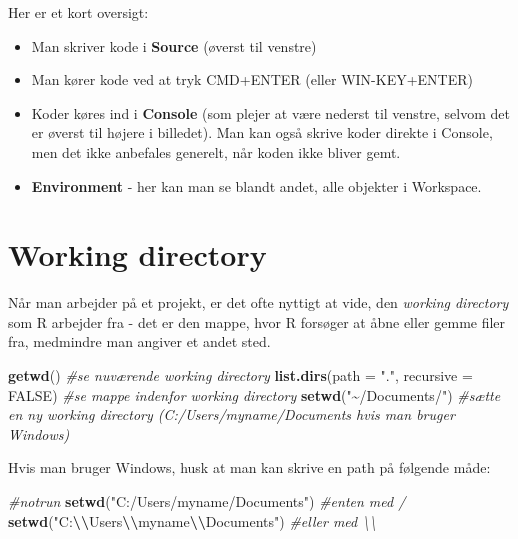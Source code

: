 \documentclass[
]{book}
\newenvironment{Shaded}{\begin{snugshade}}{\end{snugshade}}
\newcommand{\AttributeTok}[1]{\textcolor[rgb]{0.13,0.29,0.53}{#1}}
\newcommand{\CommentTok}[1]{\textcolor[rgb]{0.56,0.35,0.01}{\textit{#1}}}
\newcommand{\ConstantTok}[1]{\textcolor[rgb]{0.56,0.35,0.01}{#1}}
\newcommand{\FunctionTok}[1]{\textcolor[rgb]{0.13,0.29,0.53}{\textbf{#1}}}
\newcommand{\NormalTok}[1]{#1}
\newcommand{\SpecialCharTok}[1]{\textcolor[rgb]{0.81,0.36,0.00}{\textbf{#1}}}
\newcommand{\StringTok}[1]{\textcolor[rgb]{0.31,0.60,0.02}{#1}}
\providecommand{\tightlist}{%
  \setlength{\itemsep}{0pt}\setlength{\parskip}{0pt}}
\theoremstyle{definition}
\theoremstyle{definition}
\theoremstyle{definition}
\theoremstyle{definition}
\theoremstyle{remark}
\begin{document}
Her er et kort oversigt:

\begin{itemize}
\tightlist
\item
  Man skriver kode i \textbf{Source} (øverst til venstre)
\item
  Man kører kode ved at tryk CMD+ENTER (eller WIN-KEY+ENTER)
\item
  Koder køres ind i \textbf{Console} (som plejer at være nederst til venstre, selvom det er øverst til højere i billedet). Man kan også skrive koder direkte i Console, men det ikke anbefales generelt, når koden ikke bliver gemt.
\item
  \textbf{Environment} - her kan man se blandt andet, alle objekter i Workspace.
\end{itemize}

\section{Working directory}\label{working-directory}

Når man arbejder på et projekt, er det ofte nyttigt at vide, den \emph{working directory} som R arbejder fra - det er den mappe, hvor R forsøger at åbne eller gemme filer fra, medmindre man angiver et andet sted.

\begin{Shaded}
\begin{Highlighting}[]
\FunctionTok{getwd}\NormalTok{() }\CommentTok{\#se nuværende working directory}
\FunctionTok{list.dirs}\NormalTok{(}\AttributeTok{path =} \StringTok{"."}\NormalTok{, }\AttributeTok{recursive =} \ConstantTok{FALSE}\NormalTok{) }\CommentTok{\#se mappe indenfor working directory}
\FunctionTok{setwd}\NormalTok{(}\StringTok{"\textasciitilde{}/Documents/"}\NormalTok{) }\CommentTok{\#sætte en ny working directory (C:/Users/myname/Documents hvis man bruger Windows)}
\end{Highlighting}
\end{Shaded}

Hvis man bruger Windows, husk at man kan skrive en path på følgende måde:

\begin{Shaded}
\begin{Highlighting}[]
\CommentTok{\#notrun}
\FunctionTok{setwd}\NormalTok{(}\StringTok{"C:/Users/myname/Documents"}\NormalTok{) }\CommentTok{\#enten med /}
\FunctionTok{setwd}\NormalTok{(}\StringTok{"C:}\SpecialCharTok{\textbackslash{}\textbackslash{}}\StringTok{Users}\SpecialCharTok{\textbackslash{}\textbackslash{}}\StringTok{myname}\SpecialCharTok{\textbackslash{}\textbackslash{}}\StringTok{Documents"}\NormalTok{) }\CommentTok{\#eller med \textbackslash{}\textbackslash{}}
\end{Highlighting}
\end{Shaded}
\end{document}
